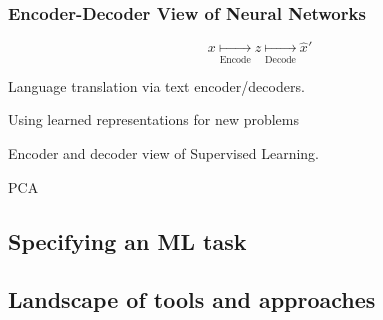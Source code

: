 \subsubsection{Encoder-Decoder View of Neural Networks}
\begin{equation*}
    x \underset{\text{Encode}}{\mapsto} z \underset{\text{Decode}}{\mapsto} \hat x'
\end{equation*}

Language translation via text encoder/decoders.
\begin{example}
    Using learned representations for new problems
\end{example}

Encoder and decoder view of Supervised Learning.

\begin{example} PCA
    
\end{example}



\subsection{Specifying an ML task}

\subsection{Landscape of tools and approaches}